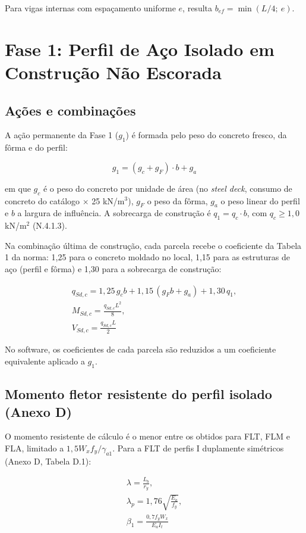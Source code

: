 Para vigas internas com espaçamento uniforme $e$, resulta $b_{ef} = \min(L/4;\ e)$.

\section{Fase 1: Perfil de Aço Isolado em Construção Não Escorada}\label{sec:2.4}

\subsection{Ações e combinações}\label{sec:2.4.1}
A ação permanente da Fase 1 ($g_1$) é formada pelo peso do concreto fresco, da fôrma e do perfil:

\[
  g_1 = (g_c + g_F) \cdot b + g_a
\]

em que $g_c$ é o peso do concreto por unidade de área (no \emph{steel deck}, consumo de concreto do catálogo \ensuremath{\times} 25 kN/m\ensuremath{^3}), $g_F$ o peso da fôrma, $g_a$ o peso linear do perfil e $b$ a largura de influência. A sobrecarga de construção é $q_1 = q_c \cdot b$, com $q_c \ge 1{,}0$ kN/m\ensuremath{^2} (N.4.1.3).

Na combinação última de construção, cada parcela recebe o coeficiente da Tabela 1 da norma: 1,25 para o concreto moldado no local, 1,15 para as estruturas de aço (perfil e fôrma) e 1,30 para a sobrecarga de construção:

\begin{gather*}
  q_{Sd,c} = 1{,}25 \, g_c b + 1{,}15 \, (g_F b + g_a) + 1{,}30 \, q_1, \\
  M_{Sd,c} = \frac{q_{Sd,c} L^2}{8}, \\
  V_{Sd,c} = \frac{q_{Sd,c} L}{2}
\end{gather*}

No software, os coeficientes de cada parcela são reduzidos a um coeficiente equivalente aplicado a $g_1$.

\subsection{Momento fletor resistente do perfil isolado (Anexo D)}\label{sec:2.4.2}
O momento resistente de cálculo é o menor entre os obtidos para FLT, FLM e FLA, limitado a $1{,}5 W_x f_y / \gamma_{a1}$. Para a FLT de perfis I duplamente simétricos (Anexo D, Tabela D.1):

\begin{gather*}
  \lambda = \frac{L_b}{r_y}, \\
  \lambda_p = 1{,}76\sqrt{\frac{E_a}{f_y}}, \\
  \beta_1 = \frac{0{,}7 f_y W_x}{E_a I_t}
\end{gather*}

